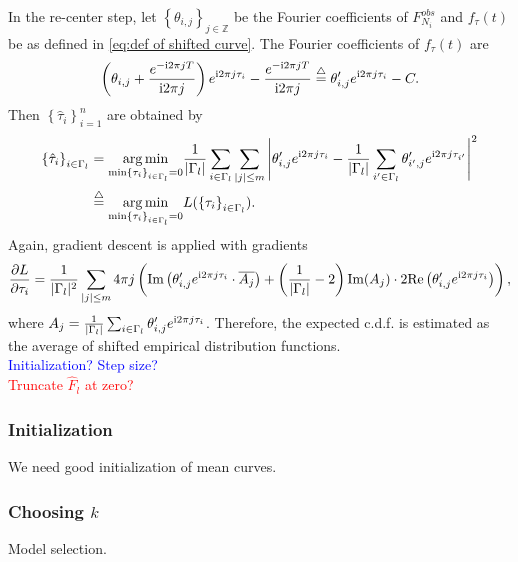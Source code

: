 		In the re-center step, let $\left\{ \theta_{i,j} \right\}_{j\in \mathbb{Z}}$ be the Fourier coefficients of $F_{N_i}^{obs}$ and $f_\tau(t)$ be as defined in \eqref{eq:def of shifted curve}. The Fourier coefficients of $f_\tau(t)$ are
		\begin{align*}
		\left( \theta_{i,j}+\frac{e^{-\complexunit2\pi j T}}{\complexunit{}2\pi j} \right) e^{\complexunit2\pi j \tau_i }-\frac{e^{-\complexunit2\pi j T}}{\complexunit{}2\pi j} 
		\overset{\triangle}{=}
		\theta_{i,j}' e^{\complexunit2\pi j \tau_i }-C. 
		\end{align*}
		Then
		$\left\{ \hat\tau_i \right\}_{i=1}^n$ are obtained by 
		\begin{align*}
		\left\{ \hat\tau_i \right\}_{i\in\Gamma_l} &= 
		\underset{\min \left\{ \tau_i \right\}_{i\in\Gamma_l}=0}{\arg\min}
		\frac{1}{|\Gamma_l|}\sum_{i\in\Gamma_l}\sum_{|j|\leq m} 
		\left| 
		\theta_{i,j}' e^{\complexunit2\pi j \tau_i } -
		\frac{1}{|\Gamma_l|}\sum_{i'\in\Gamma_l}\theta_{i',j}' e^{\complexunit2\pi j \tau_{i'} } 
		\right|^2 \\
		&\overset{\triangle}{=}
		\underset{\min \left\{ \tau_i \right\}_{i\in\Gamma_l}=0}{\arg\min}
		L(\left\{ \tau_i \right\}_{i\in\Gamma_l})
		.
		\end{align*}
		Again, gradient descent is applied with gradients
		\begin{align*}
		 \frac{\partial L}{\partial \tau_i} = 
		 \frac{1}{|\Gamma_l|^2}
		 \sum_{|j|\leq m} 4\pi j
		 \left( 
		 	\text{Im}\left( \theta_{i,j}' e^{\complexunit{}2\pi j \tau_i}\cdot\overline{A_j}\right)+
		 	\left(\frac{1}{|\Gamma_l|}-2\right) \text{Im}(A_j)\cdot 2 \text{Re}\left( \theta_{i,j}' e^{\complexunit{}2\pi j \tau_i}   \right) 
		 \right) ,
		 \end{align*}
		 where $A_j=\frac{1}{|\Gamma_l|}\sum_{i\in\Gamma_l}\theta_{i,j}'e^{\text{i}{}2\pi j \tau_i} $.
		 Therefore, the expected c.d.f. is estimated as the average of shifted empirical distribution functions.
		 \\
		 \textcolor{blue}{Initialization? Step size?}\\
		 \textcolor{red}{Truncate $\hat F_l$ at zero?}
		  



		\subsubsection*{Initialization}
			We need good initialization of mean curves.

		\subsubsection*{Choosing $k$}
			Model selection. 



